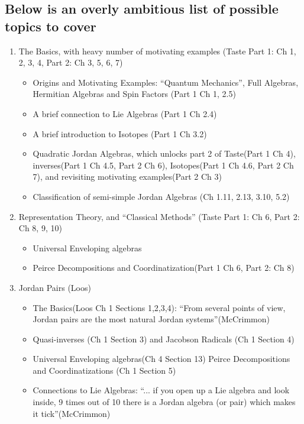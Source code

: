 \documentclass[12pt]{amsart}
\begin{document}
\subsection*{Below is an overly ambitious list of possible topics to cover}
\begin{enumerate}
    \item The Basics, with heavy number of motivating examples (Taste Part 1: Ch 1, 2, 3, 4, Part 2: Ch 3, 5, 6, 7)
    \begin{itemize}
        \item Origins and Motivating Examples: ``Quantum Mechanics'', Full Algebras, Hermitian Algebras and Spin Factors (Part 1 Ch 1, 2.5)
        \item A brief connection to Lie Algebras (Part 1 Ch 2.4)
        \item A brief introduction to Isotopes (Part 1 Ch 3.2)
        \item Quadratic Jordan Algebras, which unlocks part 2 of Taste(Part 1 Ch 4), 
        inverses(Part 1 Ch 4.5, Part 2 Ch 6), Isotopes(Part 1 Ch 4.6, Part 2 Ch 7), and
        revisiting motivating examples(Part 2 Ch 3)
        \item Classification of semi-simple Jordan Algebras (Ch 1.11, 2.13, 3.10, 5.2)
    \end{itemize}
    \item Representation Theory, and ``Classical Methods'' (Taste Part 1: Ch 6, Part 2: Ch 8, 9, 10)
    \begin{itemize}
        \item Universal Enveloping algebras
        \item Peirce Decompositions and Coordinatization(Part 1 Ch 6, Part 2: Ch 8)
    \end{itemize}
    \item Jordan Pairs (Loos)
    \begin{itemize}
        \item The Basics(Loos Ch 1 Sections 1,2,3,4): ``From several points of view, Jordan pairs are the most natural Jordan systems''(McCrimmon)
        \item Quasi-inverses (Ch 1 Section 3) and Jacobson Radicals (Ch 1 Section 4)
        \item Universal Enveloping algebras(Ch 4 Section 13) Peirce Decompositions and Coordinatizations (Ch 1 Section 5)
        \item Connections to Lie Algebras: ``... if you open up a Lie algebra and look inside, 9 times out of 10 there is a Jordan algebra (or pair)  which makes it tick''(McCrimmon)

\end{itemize}
\end{enumerate}
\end{document}
